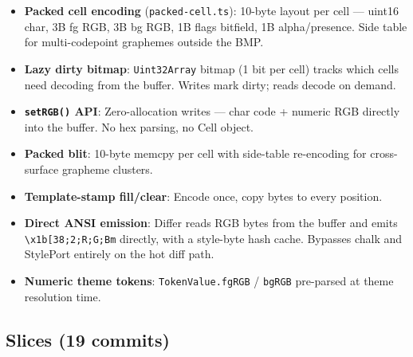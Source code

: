 \begin{itemize}
\tightlist
\item
  \textbf{Packed cell encoding} (\texttt{p\allowbreak{}a\allowbreak{}c\allowbreak{}k\allowbreak{}e\allowbreak{}d\allowbreak{}-\allowbreak{}c\allowbreak{}e\allowbreak{}l\allowbreak{}l\allowbreak{}.\allowbreak{}t\allowbreak{}s}): 10-byte layout per cell --- uint16 char, 3B fg RGB, 3B bg RGB, 1B flags bitfield, 1B alpha/presence. Side table for multi-codepoint graphemes outside the BMP.
\item
  \textbf{Lazy dirty bitmap}: \texttt{U\allowbreak{}i\allowbreak{}n\allowbreak{}t\allowbreak{}3\allowbreak{}2\allowbreak{}A\allowbreak{}r\allowbreak{}r\allowbreak{}a\allowbreak{}y} bitmap (1 bit per cell) tracks which cells need decoding from the buffer. Writes mark dirty; reads decode on demand.
\item
  \textbf{\texttt{s\allowbreak{}e\allowbreak{}t\allowbreak{}R\allowbreak{}G\allowbreak{}B\allowbreak{}(\allowbreak{})} API}: Zero-allocation writes --- char code + numeric RGB directly into the buffer. No hex parsing, no Cell object.
\item
  \textbf{Packed blit}: 10-byte memcpy per cell with side-table re-encoding for cross-surface grapheme clusters.
\item
  \textbf{Template-stamp fill/clear}: Encode once, copy bytes to every position.
\item
  \textbf{Direct ANSI emission}: Differ reads RGB bytes from the buffer and emits \texttt{\textbackslash{}\allowbreak{}x\allowbreak{}1\allowbreak{}b\allowbreak{}[\allowbreak{}3\allowbreak{}8\allowbreak{};\allowbreak{}2\allowbreak{};\allowbreak{}R\allowbreak{};\allowbreak{}G\allowbreak{};\allowbreak{}B\allowbreak{}m} directly, with a style-byte hash cache. Bypasses chalk and StylePort entirely on the hot diff path.
\item
  \textbf{Numeric theme tokens}: \texttt{T\allowbreak{}o\allowbreak{}k\allowbreak{}e\allowbreak{}n\allowbreak{}V\allowbreak{}a\allowbreak{}l\allowbreak{}u\allowbreak{}e\allowbreak{}.\allowbreak{}f\allowbreak{}g\allowbreak{}R\allowbreak{}G\allowbreak{}B} / \texttt{b\allowbreak{}g\allowbreak{}R\allowbreak{}G\allowbreak{}B} pre-parsed at theme resolution time.
\end{itemize}

\subsection{Slices (19 commits)}\label{record-250-slices-19-commits}

